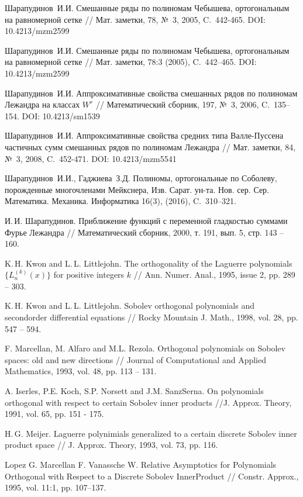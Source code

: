 Шарапудинов~И.И. Смешанные ряды по полиномам Чебышева, ортогональным на равномерной сетке // Мат. заметки, 78, №~3, 2005, C.~442-465. DOI: 10.4213/mzm2599

Шарапудинов~И.И. Смешанные ряды по полиномам Чебышева, ортогональным на равномерной сетке // Мат. заметки, 78:3 (2005), C.~442--465. DOI: 10.4213/mzm2599

Шарапудинов~И.И. Аппроксимативные свойства смешанных рядов по полиномам Лежандра на классах $W^r$ //   Математический сборник, 197, №~3, 2006, C.~135--154. DOI: 10.4213/sm1539

Шарапудинов~И.И. Аппроксимативные свойства средних типа Валле-Пуссена частичных сумм смешанных рядов по полиномам Лежандра // Мат. заметки, 84, №~3, 2008, C.~452-471. DOI: 10.4213/mzm5541

Шарапудинов~И.И., Гаджиева~З.Д. Полиномы, ортогональные по Соболеву, порожденные многочленами Мейкснера, Изв. Сарат. ун-та. Нов. сер. Сер. Математика. Механика. Информатика {16}(3), (2016), C.~310--321.

 И.\,И. Шарапудинов. Приближение функций с переменной гладкостью суммами Фурье Лежандра // Математический сборник, 2000, т. 191, вып. 5, стр. 143 – 160.

 K.\,H. Kwon and L.\,L. Littlejohn. The orthogonality of the Laguerre polynomials $\{L_n^{(k)}(x)\}$ for positive integers $k$ // Ann. Numer. Anal., 1995, issue 2, pp. 289 – 303.

 K.\,H. Kwon and L.\,L. Littlejohn. Sobolev orthogonal polynomials and secondorder differential equations // Rocky Mountain J. Math., 1998, vol. 28, pp. 547 – 594.

 F. Marcellan, M. Alfaro and M.L. Rezola. Orthogonal polynomials on Sobolev spaces: old and new directions // Journal of Computational and Applied Mathematics, 1993, vol. 48, pp. 113 – 131.

 A. Iserles, P.E. Koch, S.P. Norsett and J.M. SanzSerna. On polynomials orthogonal with respect to certain Sobolev inner products //J. Approx. Theory, 1991, vol. 65, pp. 151 - 175.

 H.\,G. Meijer. Laguerre polynimials generalized to a certain discrete Sobolev inner product space // J. Approx. Theory, 1993, vol. 73, pp. 116.

 Lopez G. Marcellan F. Vanassche W. Relative Asymptotics for Polynomials Orthogonal with Respect to a Discrete Sobolev InnerProduct // Constr. Approx., 1995, vol. 11:1, pp. 107–137.

